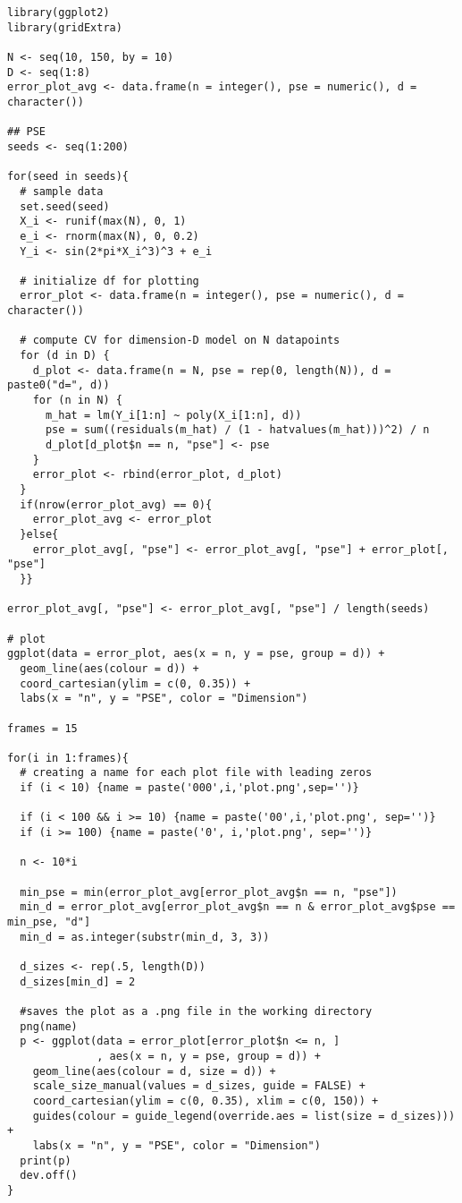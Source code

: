 
\begin{verbatim}
library(ggplot2)
library(gridExtra)

N <- seq(10, 150, by = 10)
D <- seq(1:8)
error_plot_avg <- data.frame(n = integer(), pse = numeric(), d = character())

## PSE
seeds <- seq(1:200)

for(seed in seeds){
  # sample data
  set.seed(seed)
  X_i <- runif(max(N), 0, 1)
  e_i <- rnorm(max(N), 0, 0.2)
  Y_i <- sin(2*pi*X_i^3)^3 + e_i
  
  # initialize df for plotting
  error_plot <- data.frame(n = integer(), pse = numeric(), d = character())
  
  # compute CV for dimension-D model on N datapoints
  for (d in D) {
    d_plot <- data.frame(n = N, pse = rep(0, length(N)), d = paste0("d=", d))
    for (n in N) {
      m_hat = lm(Y_i[1:n] ~ poly(X_i[1:n], d))
      pse = sum((residuals(m_hat) / (1 - hatvalues(m_hat)))^2) / n
      d_plot[d_plot$n == n, "pse"] <- pse
    }
    error_plot <- rbind(error_plot, d_plot)
  }
  if(nrow(error_plot_avg) == 0){
    error_plot_avg <- error_plot
  }else{
    error_plot_avg[, "pse"] <- error_plot_avg[, "pse"] + error_plot[, "pse"] 
  }}

error_plot_avg[, "pse"] <- error_plot_avg[, "pse"] / length(seeds)

# plot
ggplot(data = error_plot, aes(x = n, y = pse, group = d)) + 
  geom_line(aes(colour = d)) +
  coord_cartesian(ylim = c(0, 0.35)) +
  labs(x = "n", y = "PSE", color = "Dimension")

frames = 15

for(i in 1:frames){
  # creating a name for each plot file with leading zeros
  if (i < 10) {name = paste('000',i,'plot.png',sep='')}
  
  if (i < 100 && i >= 10) {name = paste('00',i,'plot.png', sep='')}
  if (i >= 100) {name = paste('0', i,'plot.png', sep='')}
  
  n <- 10*i
  
  min_pse = min(error_plot_avg[error_plot_avg$n == n, "pse"])
  min_d = error_plot_avg[error_plot_avg$n == n & error_plot_avg$pse == min_pse, "d"]
  min_d = as.integer(substr(min_d, 3, 3))
  
  d_sizes <- rep(.5, length(D))
  d_sizes[min_d] = 2
  
  #saves the plot as a .png file in the working directory
  png(name)
  p <- ggplot(data = error_plot[error_plot$n <= n, ]
              , aes(x = n, y = pse, group = d)) + 
    geom_line(aes(colour = d, size = d)) +
    scale_size_manual(values = d_sizes, guide = FALSE) +
    coord_cartesian(ylim = c(0, 0.35), xlim = c(0, 150)) +
    guides(colour = guide_legend(override.aes = list(size = d_sizes))) + 
    labs(x = "n", y = "PSE", color = "Dimension")
  print(p)
  dev.off()
}


\end{verbatim}
